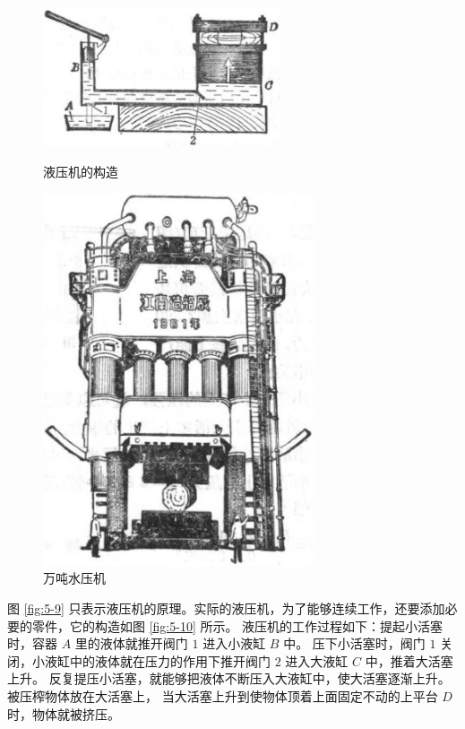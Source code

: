 \begin{figure}[htbp]
    \centering
    \begin{minipage}{7cm}
    \centering
    \vspace{17em}
    \includegraphics[width=7cm]{../pic/czwl1-ch5-10}
    \caption{液压机的构造}\label{fig:5-10}
    \end{minipage}
    \qquad
    \begin{minipage}{8cm}
    \centering
    \includegraphics[width=8cm]{../pic/czwl1-ch5-11}
    \caption{万吨水压机}\label{fig:5-11}
    \end{minipage}
\end{figure}


图 \ref{fig:5-9} 只表示液压机的原理。实际的液压机，为了能够连续工作，还要添加必要的零件，它的构造如图 \ref{fig:5-10} 所示。
液压机的工作过程如下：提起小活塞时，容器 $A$ 里的液体就推开阀门 $1$ 进入小液缸 $B$ 中。
压下小活塞时，阀门 $1$ 关闭，小液缸中的液体就在压力的作用下推开阀门 $2$ 进入大液缸 $C$ 中，推着大活塞上升。
反复提压小活塞，就能够把液体不断压入大液缸中，使大活塞逐渐上升。被压榨物体放在大活塞上，
当大活塞上升到使物体顶着上面固定不动的上平台 $D$ 时，物体就被挤压。

